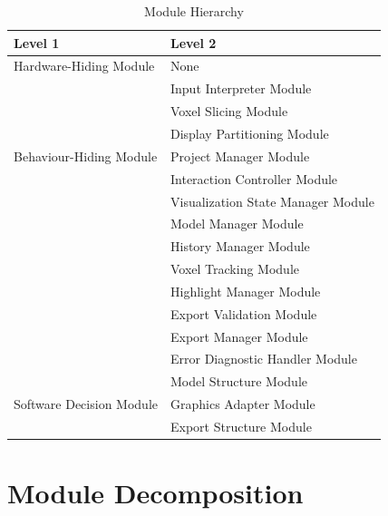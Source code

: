 \documentclass[12pt, titlepage]{article}
\begin{document}
\begin{table}[h!]
\centering
\caption{Module Hierarchy}
\begin{tabular}{p{} p{}}
\toprule
\textbf{Level 1} & \textbf{Level 2}\\
\midrule

{Hardware-Hiding Module} & None \\
\midrule

\multirow{7}{0.3\textwidth}{Behaviour-Hiding Module} & Input Interpreter Module\\
& Voxel Slicing Module\\
& Display Partitioning Module\\
& Project Manager Module\\
& Interaction Controller Module\\
& Visualization State Manager Module\\
& Model Manager Module\\
& History Manager Module\\
& Voxel Tracking Module\\
& Highlight Manager Module\\
& Export Validation Module\\
& Export Manager Module\\
& Error Diagnostic Handler Module\\
\midrule

\multirow{3}{0.3\textwidth}{Software Decision Module} & Model Structure Module\\
& Graphics Adapter Module\\
& Export Structure Module\\
\bottomrule

\end{tabular}\label{TblMH}
\end{table}

\section{Module Decomposition}\label{SecMD}
\end{document}
